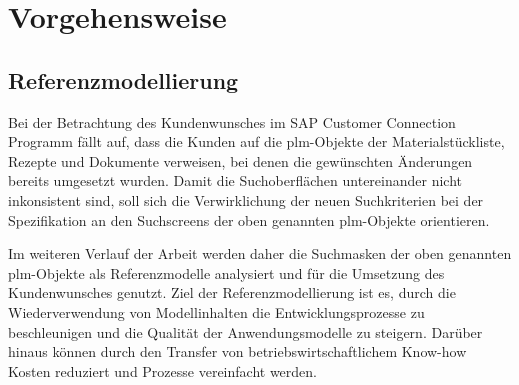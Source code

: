 \clearpage
\chapter{Vorgehensweise}
\section{Referenzmodellierung}

Bei der Betrachtung des Kundenwunsches im SAP Customer Connection Programm fällt auf, dass die Kunden auf die \ac{plm}-Objekte der Materialstückliste, Rezepte und Dokumente verweisen, bei denen die gewünschten Änderungen bereits umgesetzt wurden. Damit die Suchoberflächen untereinander nicht inkonsistent sind, soll sich die Verwirklichung der neuen Suchkriterien bei der Spezifikation an den Suchscreens der oben genannten \ac{plm}-Objekte orientieren.\autocite[Vgl.][]{ADSESPEC}




Im weiteren Verlauf der Arbeit werden daher die Suchmasken der oben genannten \ac{plm}-Objekte als Referenzmodelle analysiert und für die Umsetzung des Kundenwunsches genutzt. 
Ziel der Referenzmodellierung ist es, durch die Wiederverwendung von Modellinhalten die Entwicklungsprozesse zu beschleunigen und die Qualität der Anwendungsmodelle zu steigern.\autocite[Vgl.][S.1-2]{VOMBROCKE2018}  Darüber hinaus können durch den Transfer von betriebswirtschaftlichem Know-how Kosten reduziert und Prozesse vereinfacht werden.\autocite[Vgl.][S.39-41]{KRCMAR2015}




